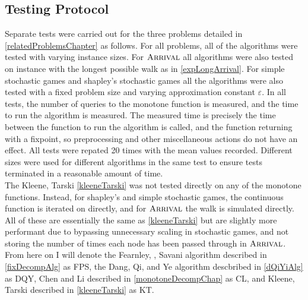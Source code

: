 \subsection{Testing Protocol}
Separate tests were carried out for the three problems detailed in \cref{relatedProblemsChapter} as follows.
For all problems, all of the algorithms were tested with varying instance sizes. For $\textsc{Arrival}$
all algorithms were also tested on instance with the longest possible walk as in \cref{expLongArrival}.
For simple stochastic games
and shapley's stochastic games all the algorithms were also tested with a fixed problem size and varying
approximation constant $\varepsilon$. In all tests, the number of queries to the monotone function is
measured, and the time to run the algorithm is measured. The measured time is precisely the time between
the function to run the algorithm is called, and the function returning with a fixpoint, so preprocessing
and other miscellaneous actions do not have an effect. All tests were repated 20 times with the
mean values recorded. Different sizes were used for different algorithms in the same test
to ensure tests terminated in a reasonable amount of time. \\
The Kleene, Tarski \cref{kleeneTarski} was not tested directly on any of the monotone functions.
Instead, for shapley's and simple stochastic games, the continuous function is iterated on directly,
and for $\textsc{Arrival}$ the walk is simulated directly. All of these are essentially the same as \cref{kleeneTarski}
but are slightly more performant due to bypassing unnecessary scaling in stochastic games,
and not storing the number of times each node has been passed through in $\textsc{Arrival}$. \\
From here on I will denote the Fearnley, \pav, Savani algorithm described in \cref{fixDecompAlg}
as FPS, the Dang, Qi, and Ye algorithm descbribed in \cref{dQiYiAlg} as
DQY, Chen and Li described in \cref{monotoneDecompChap} as CL, and Kleene, Tarski 
described in \cref{kleeneTarski} as KT.
